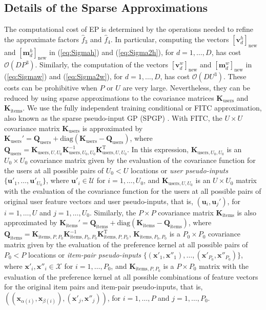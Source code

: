 \documentclass{article}
\begin{document}
\subsection{Details of the Sparse Approximations} \label{sec:sparse}

The computational cost of EP is determined by the operations needed to refine the approximate factors $\hat{f}_3$ and $\hat{f}_4$.
In particular, computing the vectors $[\mathbf{v}_{d}^{h}]_\text{new}$ and $[\mathbf{m}_{d}^{h}]_\text{new}$ in
(\ref{eq:Sigmah}) and (\ref{eq:Sigma2h}), for $d = 1,\ldots,D$, has cost $\mathcal{O}(DP^3)$. Similarly,
the computation of the vectors $[\mathbf{v}_{d}^{w}]_\text{new}$ and $[\mathbf{m}_{d}^{w}]_\text{new}$ in
(\ref{eq:Sigmaw}) and (\ref{eq:Sigma2w}), for $d = 1,\ldots,D$, has cost $\mathcal{O}(DU^3)$.
These costs can be prohibitive when $P$ or $U$ are very large.
Nevertheless, they can be reduced by using sparse approximations to the covariance matrices $\mathbf{K}_\text{users}$
and $\mathbf{K}_\text{items}$. We use the fully independent training conditional or FITC
approximation, also known as the sparse pseudo-input GP (SPGP) \cite{snelson2006}.
With FITC, the $U \times U$ covariance matrix $\mathbf{K}_\text{users}$ is approximated by
$\mathbf{K}_\text{users}' = \mathbf{Q}_\text{users} + \text{diag}(\mathbf{K}_\text{users}-\mathbf{Q}_\text{users})$,
where $\mathbf{Q}_\text{users} = \mathbf{K}_{\text{users},U,U_0} \mathbf{K}_{\text{users},U_0,U_0}^{-1} \mathbf{K}_{\text{users},U,U_0}^\text{T}$.
In this expression, $\mathbf{K}_{\text{users},U_0,U_0}$ is an $U_0 \times U_0$ covariance matrix given by the evaluation
of the covariance function for the users at all possible pairs of $U_0 < U$ locations
or \emph{user pseudo-inputs} $\{\mathbf{u}'_1,\ldots,\mathbf{u}'_{U_0}\}$,
where $\mathbf{u}'_i \in \mathcal{U}$ for $i = 1,\ldots,U_0$, and
$\mathbf{K}_{\text{users},U,U_0}$ is an $U \times U_0$ matrix with the evaluation of
the covariance function for the users at all possible pairs of original user feature vectors and user pseudo-inputs,
that is, $(\mathbf{u}_i, \mathbf{u}_j')$, for $i = 1,\ldots,U$ and $j = 1,\ldots,U_0$.
Similarly, the $P \times P$ covariance matrix $\mathbf{K}_\text{items}$ is also approximated by
$\mathbf{K}_\text{items}' = \mathbf{Q}_\text{items} + \text{diag}(\mathbf{K}_\text{items}-\mathbf{Q}_\text{items})$,
where $\mathbf{Q}_\text{items} = \mathbf{K}_{\text{items},P,P_0} \mathbf{K}_{\text{items},P_0,P_0}^{-1} \mathbf{K}_{\text{items},P,P_0}^\text{T}$,
$\mathbf{K}_{\text{items},P_0,P_0}$ is a $P_0 \times P_0$ covariance matrix given by the evaluation
of the preference kernel at all possible pairs of $P_0 < P$ locations or
\emph{item-pair pseudo-inputs} $\{(\mathbf{x}'_1,\mathbf{x}''_1),\ldots,(\mathbf{x}'_{P_0},\mathbf{x}''_{P_0})\}$,
where $\mathbf{x}'_i,\mathbf{x}''_i \in \mathcal{X}$ for $i = 1,\ldots,P_0$,
and $\mathbf{K}_{\text{items},P,P_0}$ is a $P \times P_0$ matrix with the evaluation of
the preference kernel at all possible combinations of feature vectors for the original item pairs and item-pair pseudo-inputs,
that is, $((\mathbf{x}_{\alpha(i)},\mathbf{x}_{\beta(i)}), (\mathbf{x}'_j,\mathbf{x}''_j))$, for $i = 1,\ldots,P$ and $j = 1,\ldots,P_0$.
\end{document}
